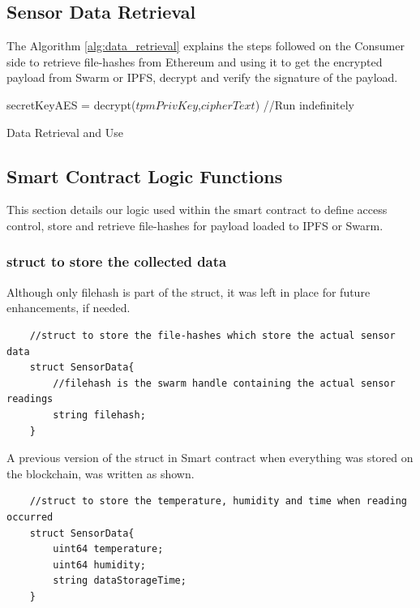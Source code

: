 \documentclass[11pt,openright]{report}
\begin{document}
\newpage
\subsection{Sensor Data Retrieval}
The Algorithm \ref{alg:data_retrieval} explains the steps followed on the Consumer side to retrieve file-hashes from Ethereum and using it to get the encrypted payload from Swarm or IPFS, decrypt and verify the signature of the payload.

\begin{algorithm}
  secretKeyAES = decrypt($tpmPrivKey$,$cipherText$)\;
  //Run indefinitely \newline
 \caption{Data Retrieval and Use}
 \label{alg:data_retrieval}
\end{algorithm}

\subsection{Smart Contract Logic Functions}
This section details our logic used within the smart contract to define access control, store and retrieve file-hashes for payload loaded to IPFS or Swarm. 

\subsubsection{struct to store the collected data}
Although only filehash is part of the struct, it was left in place for future enhancements, if needed.
\begin{verbatim}
    //struct to store the file-hashes which store the actual sensor data
    struct SensorData{
        //filehash is the swarm handle containing the actual sensor readings
        string filehash;
    }
\end{verbatim}

A previous version of the struct in Smart contract when everything was stored on the blockchain, was written as shown.

\begin{verbatim}
    //struct to store the temperature, humidity and time when reading occurred
    struct SensorData{
        uint64 temperature;
        uint64 humidity;
        string dataStorageTime;
    }
\end{verbatim}
\end{document}
